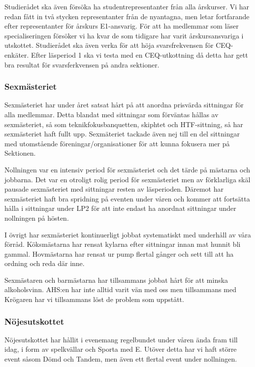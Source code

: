\documentclass[../_main/handlingar.tex]{subfiles}
\begin{document}
Studierådet ska även försöka ha studentrepresentanter från alla årskurser. Vi har redan fått in två stycken representanter från de nyantagna, men letar fortfarande efter representanter för årskurs E1-ansvarig. För att ha medlemmar som läser specialiseringen försöker vi ha kvar de som tidigare har varit årskursansvariga i utskottet. Studierådet ska även verka för att höja svarsfrekvensen för CEQ-enkäter. Efter läsperiod 1 ska vi testa med en CEQ-utkottning då detta har gett bra resultat för svarsferkvensen på andra sektioner.


\subsubsection*{Sexmästeriet}

Sexmästeriet har under året satsat hårt på att anordna prisvärda sittningar för alla medlemmar. Detta blandat med sittningar som förväntas hållas av sexmästeriet, så som teknikfokusbanquetten, skiphtet och HTF-sittning, så har sexmästeriet haft fullt upp. Sexmäteriet tackade även nej till en del sittningar med utomstående föreningar/organisationer för att kunna fokusera mer på Sektionen.

Nollningen var en intensiv period för sexmästeriet och det tärde på mästarna och jobbarna. Det var en otroligt rolig period för sexmästeriet men av förklarliga skäl pausade sexmästeriet med sittningar resten av läsperioden. Däremot har sexmästeriet haft bra spridning på eventen under våren och kommer att fortsätta hålla i sittningar under LP2 för att inte endast ha anordnat sittningar under nollningen på hösten. 

I övrigt har sexmästeriet kontinuerligt jobbat systematiskt med underhåll av våra förråd. Köksmästarna har rensat kylarna efter sittningar innan mat hunnit bli gammal. Hovmästarna har rensat ur pump flertal gånger och sett till att ha ordning och reda där inne.

Sexmästaren och barmästarna har tillsammans jobbat hårt för att minska alkoholsvinn. AHS:en har inte alltid varit vän med oss men tillsammans med Krögaren har vi tillsammans löst de problem som uppstått. 

\subsubsection*{Nöjesutskottet}

Nöjesutskottet har hållit i evenemang regelbundet under våren ända fram till idag, i form av spelkvällar och Sporta med E. Utöver detta har vi haft större event såsom Dömd och Tandem, men även ett flertal event under nollningen.   
\end{document}
